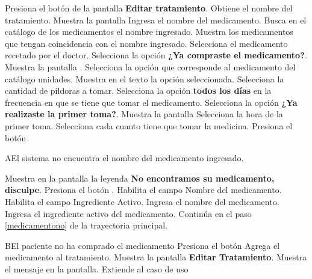 \begin{UCtrayectoria}
	
	\UCpaso [\UCactor] Presiona el botón  de la pantalla \textbf{Editar tratamiento}.
	\UCpaso Obtiene el nombre del tratamiento.
	\UCpaso Muestra la pantalla 
	\UCpaso [\UCactor] Ingresa el nombre del medicamento.
	\UCpaso Busca en el catálogo de los medicamentos el nombre ingresado.
	\UCpaso Muestra los medicamentos que tengan coincidencia con el nombre ingresado.
	\UCpaso [\UCactor] Selecciona el medicamento recetado por el doctor.
	\UCpaso [\UCactor] Selecciona la opción \textbf{¿Ya compraste el medicamento?}.  \label{medicamentono}
	\UCpaso Muestra la pantalla .
	\UCpaso [\UCactor] Selecciona la opción que corresponde al medicamento del catálogo unidades.
	\UCpaso Muestra en el texto la opción seleccionada.
	\UCpaso [\UCactor] Selecciona la cantidad de píldoras a tomar.
	\UCpaso [\UCactor] Selecciona la opción \textbf{todos los días} en la frecuencia en que se tiene que tomar el medicamento.
	\UCpaso [\UCactor] Selecciona la opción \textbf{¿Ya realizaste la primer toma?}. \label{frecuencia}
	\UCpaso Muestra la pantalla 
	\UCpaso [\UCactor] Selecciona la hora de la primer toma.
	\UCpaso [\UCactor] Selecciona cada cuanto tiene que tomar la medicina.
	\UCpaso [\UCactor] Presiona el botón 
	
\end{UCtrayectoria}

\begin{UCtrayectoriaA}{A}{El sistema no encuentra el nombre del medicamento ingresado.}
	
	\UCpaso Muestra en la pantalla la leyenda \textbf{No encontramos su medicamento, disculpe}.
	\UCpaso[\UCactor] Presiona el botón .
	\UCpaso Habilita el campo Nombre del medicamento.
	\UCpaso Habilita el campo Ingrediente Activo.
	\UCpaso [\UCactor] Ingresa el nombre del medicamento.
	\UCpaso [\UCactor] Ingresa el ingrediente activo del medicamento.
	\UCpaso Continúa en el paso \ref{medicamentono} de la trayectoria principal.
	
	
\end{UCtrayectoriaA}


\begin{UCtrayectoriaA}{B}{El paciente no ha comprado el medicamento}
	\UCpaso [\UCactor] Presiona el botón 
	\UCpaso Agrega el medicamento al tratamiento.
	\UCpaso Muestra la pantalla \textbf{Editar Tratamiento}.
	\UCpaso Muestra el mensaje  en la pantalla.
	\UCpaso Extiende al caso de uso 
\end{UCtrayectoriaA}



